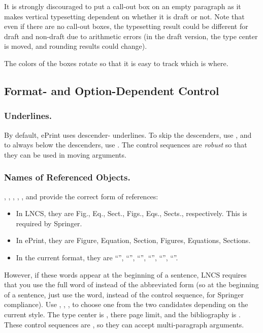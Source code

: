 
It is strongly discouraged to put a call-out box on an empty paragraph
as it makes vertical typesetting dependent on whether it is draft or not.
Note that even if there are no call-out boxes,
the typesetting result could be different for draft and non-draft
due to arithmetic errors
(in the draft version,
the type center is moved, and
rounding results could change).

The colors of the boxes rotate so that it is easy to track which is where.

\subsection{Format- and Option-Dependent Control }

\subsubsection{Underlines.}
By default, ePrint uses descender- underlines.
To  skip the descenders,
use \texttt{\string\smartunderline}, and
to always  below the descenders,
use \texttt{\string\dumbunderline}.
The control sequences are \emph{robust} so that
they can be used in moving arguments.

\subsubsection{Names of Referenced Objects.}
\texttt{\string\Figure},
\texttt{\string\Equation},
\texttt{\string\Section},
\texttt{\string\Figures},
\texttt{\string\Equations}, and
\texttt{\string\Sections}
provide the correct form of references:
\begin{itemize}
\item
In LNCS, they are Fig., Eq., Sect., Figs., Eqs., Sects., respectively.
This is required by Springer.
\item
In ePrint, they are Figure, Equation, Section, Figures, Equations, Sections.
\item
In the current format, they are
``\Figure'', ``\Equation'', ``\Section'',
``\Figures'', ``\Equations'', ``\Sections''.
\end{itemize}
However, if these words appear at the beginning of a sentence,
LNCS requires that you use the full word of instead of the abbreviated form
(so at the beginning of a sentence,
just use the word, instead of the control sequence,
for Springer compliance).
Use
\texttt{\string\WideNarrow},
\texttt{\string\PageLimitsNoLimits},
\texttt{\string\BibAlphaNumeric},
to choose one from the two candidates depending on the current style.
The type center is ,
there  page limit,
and the bibliography is .
These control sequences are \texttt{\string\long},
so they can accept multi-paragraph arguments.

